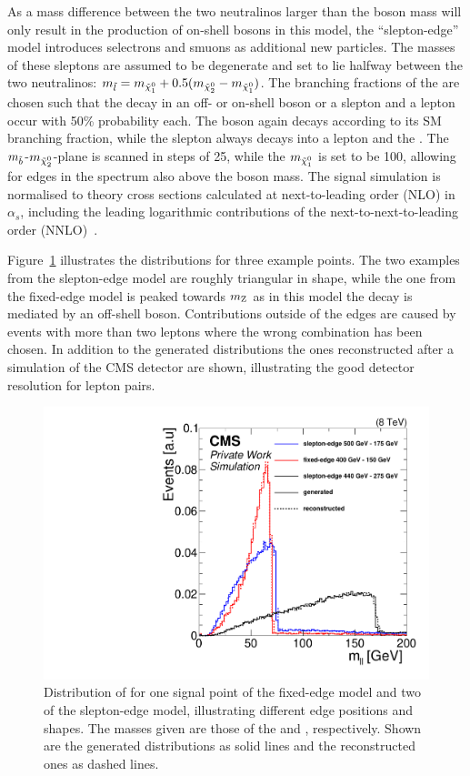 As a mass difference between the two neutralinos larger than the \Z boson mass will only result in the production of on-shell \Z bosons in this model, the ``slepton-edge'' model introduces selectrons and smuons as additional new particles. The masses of these sleptons are assumed to be degenerate and set to lie halfway between the two neutralinos: $m_{\tilde{l}} = m_{{\tilde{\chi}^0_1}} + 0.5(m_{{\tilde{\chi}^0_2}}-m_{{\tilde{\chi}^0_1}})$. The branching fractions of the \secondchi are chosen such that the decay in an off- or on-shell \Z boson or a slepton and a lepton occur with 50\% probability each. The \Z boson again decays according to its SM branching fraction, while the slepton always decays into a lepton and the \firstchi. The $m_{\tilde{b}}$-$m_{{\tilde{\chi}^0_2}}$-plane is scanned in steps of 25\GeV, while the $m_{{\tilde{\chi}^0_1}}$ is set to be 100\GeV, allowing for edges in the \mll spectrum also above the \Z boson mass. 
The signal simulation is normalised to theory cross sections calculated at next-to-leading order (NLO) in $\alpha_s$, including the leading logarithmic contributions of the next-to-next-to-leading order (NNLO)~\cite{bib-nlo-nll-01,bib-nlo-nll-02,bib-nlo-nll-03,bib-nlo-nll-04,bib-nlo-nll-05,ref:xsec}.

Figure~\ref{fig:SUSYMasses} illustrates the \mll distributions for three example points. The two examples from the slepton-edge model are roughly triangular in shape, while the one from the fixed-edge model is peaked towards $m_{\mathrm{Z}}$ as in this model the decay is mediated by an off-shell \Z boson. Contributions outside of the edges are caused by events with more than two leptons where the wrong combination has been chosen. In addition to the generated distributions the ones reconstructed after a simulation of the CMS detector are shown, illustrating the good detector resolution for lepton pairs.
\begin{figure}
\centering
\includegraphics[scale=0.3]{plots/THEO/SUSY_masses.pdf}
\caption{Distribution of \mll for one signal point of the fixed-edge model and two of the slepton-edge model, illustrating different edge positions and shapes. The masses given are those of the \sbottom and \secondchi, respectively. Shown are the generated distributions as solid lines and the reconstructed ones as dashed lines.}
\label{fig:SUSYMasses}
\end{figure}

